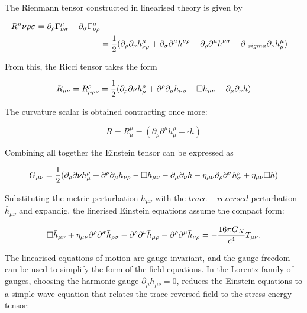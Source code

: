 \documentclass[binding=0.6cm, LaM]{sapthesis}
\begin{document}
	The Rienmann tensor constructed in linearised theory is given by

		\begin{align}
		R^{\mu}{\nu\rho\sigma} = \partial_{\rho} \Gamma^{\mu}_{\nu\sigma} - \partial_{\sigma}\Gamma^{\mu}_{\nu\rho}  \\
				      &={1 \over 2} (\partial_{\rho}\partial_{\nu}h^{\mu}_{\nu\rho} + \partial_{\sigma}\partial^{\mu}h^{\nu\rho} - \partial_{\rho}\partial^{\mu}h^{\nu\sigma} - \partial_{\					     sigma}\partial_{\nu}h^{\mu}_{\rho})
		\end{align}

	From this, the Ricci tensor takes the form

		\begin{equation}
		R_{\mu\nu} = R^{\rho}_{\mu\rho\nu} = {1 \over 2}(\partial_{\rho}\partial{\nu}h^{\rho}_{\mu} + \partial^{\rho}\partial_{\mu}h_{\nu\rho} - \square h_{\mu\nu} - \partial_{\mu}\partial_{\nu}h)
		\end{equation}

	The curvature scalar is obtained contracting once more:

		\begin{equation}
		R = R^{\mu}_{\mu} = (\partial_{\rho}\partial^{\mu}h^{\rho}_{\mu} - \square h)
		\end{equation}

	Combining all together the Einstein tensor can be expressed as
	
		\begin{equation}
		G_{\mu\nu} = {1 \over 2}(\partial_{\rho}\partial{\nu}h^{\rho}_{\mu} + \partial^{\rho}\partial_{\mu}h_{\nu\rho} - \square h_{\mu\nu} - \partial_{\mu}\partial_{\nu}h - \eta_{\mu\nu}\partial_{\rho}\partial^{\sigma}h^{\rho}_{\sigma} + \eta_{\mu\nu}\square h)
		\end{equation}

	Substituting the metric perturbation $h_{\mu\nu}$  with the $trace-reversed$ perturbation ${\bar h}_{\mu\nu}$ and expandig, 
	the linerised Einstein equations assume the  compact form:

		\begin{equation}
		\square {\bar h}_{\mu\nu} + \eta_{\mu\nu}{\partial}^{\rho}{\partial}^{\sigma}{\bar h}_{\rho\sigma} - {\partial}^{\rho}{\partial}^{\nu}{\bar h}_{\mu\rho} - {\partial}^{\rho}{\partial}^{\mu}{\bar h}_{\nu\rho} = - {{16\pi G_{N}} \over {c^4}}T_{\mu\nu}.
		\end{equation}

	The linearised equations of motion are gauge-invariant, and the gauge freedom can
 	be used to simplify the form of the field equations.
 	In the Lorentz family of gauges, choosing the harmonic gauge $ \partial_{\mu}h_{\mu\nu} = 0 $, 
	reduces the Einstein equations to a simple wave equation that relates the trace-reversed field
 	to the stress energy tensor:
\end{document}
